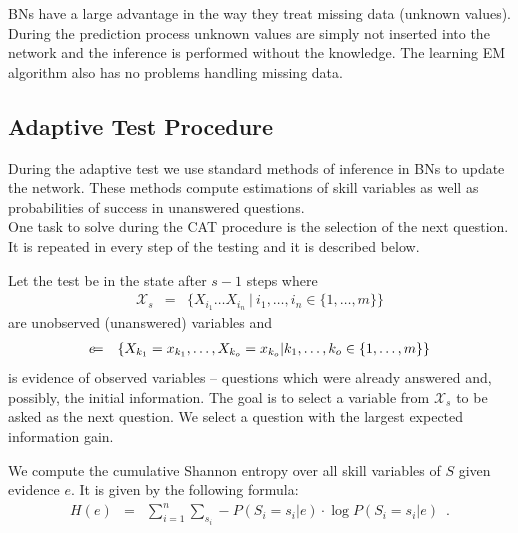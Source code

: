 BNs have a large advantage in the way they treat missing data (unknown values). During the prediction process unknown values are simply not inserted into the network and the inference is performed without the knowledge. The learning EM algorithm also has no problems handling missing data.

\subsection{Adaptive Test Procedure}
During the adaptive test we use standard methods of inference in BNs to update the network. These methods compute estimations of skill variables as well as probabilities of success in unanswered questions.\\
One task to solve during the CAT procedure is the selection of the next question. It is repeated in every step of the testing and it is described below.

Let the test be in the state after $s-1$ steps where 
\begin{eqnarray*}
\mathcal{X}_s & = & \{X_{i_1}\ldots X_{i_n} \ | \ i_1,\ldots,i_n \in \{1,\ldots,m\}\}
\end{eqnarray*}
are unobserved (unanswered) variables and 
\small
\begin{eqnarray*}
\lefteqn{e} &= &\{X_{k_1} = x_{k_1},\ldots,X_{k_o} = x_{k_o} | k_1,\ldots,k_o \in \{1,\ldots,m\}\} 
\end{eqnarray*}
\normalsize
is evidence of observed variables -- questions which were already answered and, possibly, the initial information. 
The goal is to select a variable from $\mathcal{X}_s$ to be asked as the next question. 
We select a question with the largest expected information gain. 

We compute the cumulative Shannon entropy over all skill variables of $S$ given evidence $e$.
It is given by the following formula:
\begin{eqnarray*}
H(e) & = & \sum_{i = 1}^n \sum_{s_i} -P(S_i=s_i|e) \cdot \log P(S_i=s_i|e) \enspace .
\end{eqnarray*}

